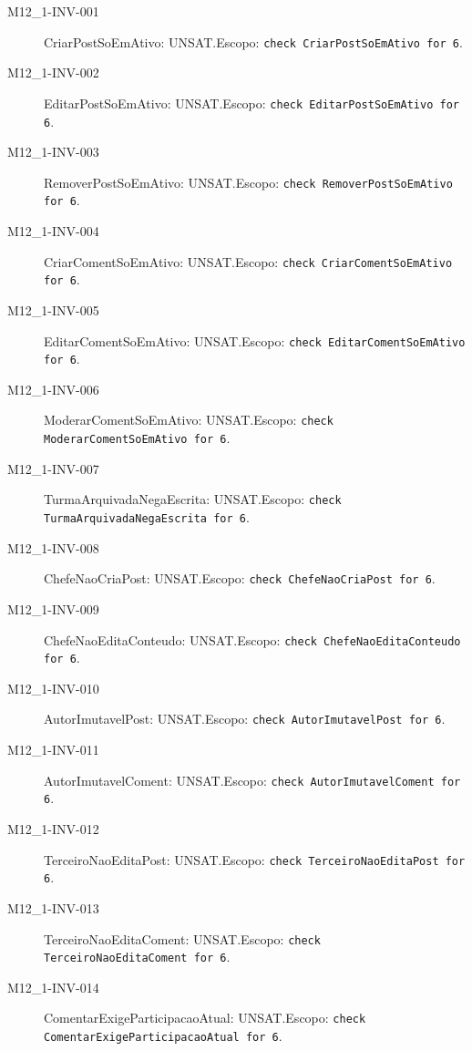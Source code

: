 \begin{description}
\item[M12\_1-INV-001] CriarPostSoEmAtivo: UNSAT.\newline Escopo: \texttt{check CriarPostSoEmAtivo for 6}.
\item[M12\_1-INV-002] EditarPostSoEmAtivo: UNSAT.\newline Escopo: \texttt{check EditarPostSoEmAtivo for 6}.
\item[M12\_1-INV-003] RemoverPostSoEmAtivo: UNSAT.\newline Escopo: \texttt{check RemoverPostSoEmAtivo for 6}.
\item[M12\_1-INV-004] CriarComentSoEmAtivo: UNSAT.\newline Escopo: \texttt{check CriarComentSoEmAtivo for 6}.
\item[M12\_1-INV-005] EditarComentSoEmAtivo: UNSAT.\newline Escopo: \texttt{check EditarComentSoEmAtivo for 6}.
\item[M12\_1-INV-006] ModerarComentSoEmAtivo: UNSAT.\newline Escopo: \texttt{check ModerarComentSoEmAtivo for 6}.
\item[M12\_1-INV-007] TurmaArquivadaNegaEscrita: UNSAT.\newline Escopo: \texttt{check TurmaArquivadaNegaEscrita for 6}.
\item[M12\_1-INV-008] ChefeNaoCriaPost: UNSAT.\newline Escopo: \texttt{check ChefeNaoCriaPost for 6}.
\item[M12\_1-INV-009] ChefeNaoEditaConteudo: UNSAT.\newline Escopo: \texttt{check ChefeNaoEditaConteudo for 6}.
\item[M12\_1-INV-010] AutorImutavelPost: UNSAT.\newline Escopo: \texttt{check AutorImutavelPost for 6}.
\item[M12\_1-INV-011] AutorImutavelComent: UNSAT.\newline Escopo: \texttt{check AutorImutavelComent for 6}.
\item[M12\_1-INV-012] TerceiroNaoEditaPost: UNSAT.\newline Escopo: \texttt{check TerceiroNaoEditaPost for 6}.
\item[M12\_1-INV-013] TerceiroNaoEditaComent: UNSAT.\newline Escopo: \texttt{check TerceiroNaoEditaComent for 6}.
\item[M12\_1-INV-014] ComentarExigeParticipacaoAtual: UNSAT.\newline Escopo: \texttt{check ComentarExigeParticipacaoAtual for 6}.

\end{description}
